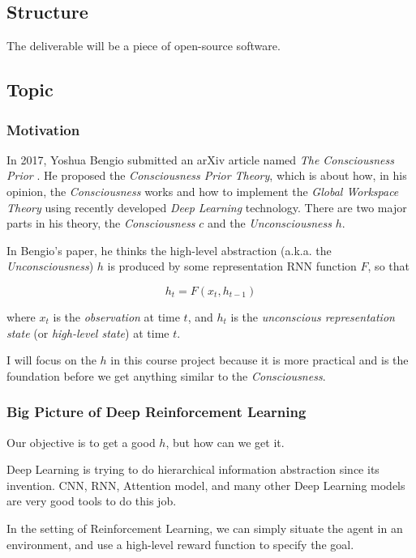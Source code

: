 \subsection{Structure}
The deliverable will be a piece of open-source software.

\subsection{Topic}

\subsubsection{Motivation}
In 2017, Yoshua Bengio submitted an arXiv article named \emph{The Consciousness Prior} \cite{bengio_consciousness_2019}. 
He proposed the \emph{Consciousness Prior Theory}, which is about how, in his opinion, the \emph{Consciousness} works and how to implement the \emph{Global Workspace Theory} using recently developed \emph{Deep Learning} technology.
There are two major parts in his theory, the \emph{Consciousness} $c$ and the \emph{Unconsciousness} $h$.

In Bengio's paper, he thinks the high-level abstraction (a.k.a. the \emph{Unconsciousness}) $h$ is produced by some representation RNN function $F$, so that

\begin{equation*}
    h_t = F(x_t, h_{t-1})
\end{equation*}

where $x_t$ is the \emph{observation} at time $t$, and $h_{t}$ is the \emph{unconscious representation state} (or \emph{high-level state}) at time $t$.

I will focus on the $h$ in this course project because it is more practical and is the foundation before we get anything similar to the \emph{Consciousness}.

\subsubsection{Big Picture of Deep Reinforcement Learning}
Our objective is to get a good $h$, but how can we get it.

Deep Learning is trying to do hierarchical information abstraction since its invention. 
CNN, RNN, Attention model, and many other Deep Learning models are very good tools to do this job.

In the setting of Reinforcement Learning, we can simply situate the agent in an environment, and use a high-level reward function to specify the goal.

